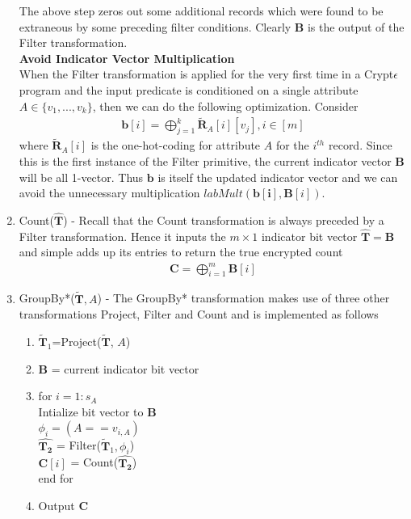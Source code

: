 \begin{enumerate}
The above step zeros out some additional records which were found to be extraneous by some preceding filter conditions. Clearly $\textbf{B}$ is the output of the \textsf{Filter} transformation.
\\\textbf{Avoid Indicator Vector Multiplication}\\
When the \textsf{Filter} transformation is applied for the very first time in a Crypt$\epsilon$ program and the input predicate is conditioned on a single attribute $A \in \{v_1,...,v_k\}$, then we can do the following optimization. Consider \begin{gather}\mathbf{b}[i]=\bigoplus_{j=1}^k \mathbf{\tilde{R}}_A[i][v_j], i \in [m]\end{gather} where $\mathbf{\tilde{R}}_A[i]$ is the one-hot-coding for attribute $A$ for the $i^{th}$ record. Since this is the first instance of the \textsf{Filter} primitive, the current indicator vector $\mathbf{B}$  will be all 1-vector. Thus $\mathbf{b}$ is itself the updated indicator vector  and we can avoid the unnecessary multiplication $labMult(\mathbf{b[i]},\mathbf{B}[i])$.   \item \textsf{Count}($\mathbf{\hat{T}}$) - Recall that the \textsf{Count} transformation is always preceded by a \textsf{Filter} transformation. Hence it inputs the $m \times 1$ indicator bit vector $\mathbf{\hat{T}}=\mathbf{B}$ and simple adds up its entries to return the true encrypted count  \begin{gather}\mathbf{C}=\bigoplus_{i=1}^m\mathbf{B}[i]\end{gather}%
 \item \textsf{GroupBy*}($\mathbf{\tilde{T}},A$) - The \textsf{GroupBy*} transformation   makes use of three other transformations \textsf{Project, Filter} and \textsf{Count} and is implemented as follows
\begin{enumerate} \item $\mathbf{\tilde{T}}_1$=\textsf{Project}($\mathbf{\tilde{T}}$, $A$) \item $\mathbf{B}$ =  current indicator bit vector \item  for $i = 1:s_A $ \\Intialize bit vector to $\mathbf{B}$  \\$\phi_i= (A==v_{i,A}) $ \\$\hat{\mathbf{T_2}}$ = \textsf{Filter}($\mathbf{\tilde{T}}_1, \phi_i$)\\ $\mathbf{C}[i]$ = \textsf{Count}($\hat{\mathbf{T_2}}$) \\ end for \item Output $\mathbf{C}$ 

\end{enumerate}
\end{enumerate}

